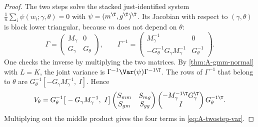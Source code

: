 \begin{proof}
The two steps solve the stacked just-identified system $\frac{1}{n}\sum_i\psi(w_i;\gamma, \theta) = 0$ with
$\psi = (m^\T, g^\T)^\T$. Its Jacobian with respect to $(\gamma, \theta)$ is block lower triangular, because $m$ does not
depend on $\theta$:
\begin{equation*}
  \Gamma = \begin{pmatrix} M_\gamma & 0 \\ G_\gamma & G_\theta\end{pmatrix},
  \qquad
  \Gamma^{-1} = \begin{pmatrix} M_\gamma^{-1} & 0 \\ -G_\theta^{-1}G_\gamma M_\gamma^{-1} & G_\theta^{-1}\end{pmatrix}.
\end{equation*}
One checks the inverse by multiplying the two matrices. By \cref{thm:A-gmm-normal} with $L = K$, the joint variance is
$\Gamma^{-1}\Var(\psi)\Gamma^{-1\T}$. The rows of $\Gamma^{-1}$ that belong to $\theta$ are
$G_\theta^{-1}[-G_\gamma M_\gamma^{-1},\ I]$. Hence
\begin{equation*}
  V_\theta = G_\theta^{-1}\big[-G_\gamma M_\gamma^{-1},\ I\big]
  \begin{pmatrix} S_{mm} & S_{mg} \\ S_{gm} & S_{gg}\end{pmatrix}
  \begin{pmatrix} -M_\gamma^{-1\T}G_\gamma^\T \\ I\end{pmatrix}G_\theta^{-1\T}.
\end{equation*}
Multiplying out the middle product gives the four terms in \eqref{eq:A-twostep-var}.
\end{proof}

